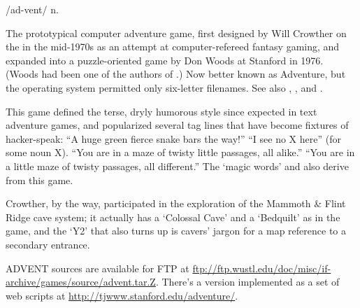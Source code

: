  /ad-vent/ n.

The prototypical computer adventure game, first designed by Will Crowther on the  in the mid-1970s as an attempt at
computer-refereed fantasy gaming, and expanded into a puzzle-oriented game by Don Woods at Stanford in 1976. (Woods had been one of the
authors of .) Now better known as Adventure, but the  operating system permitted only six-letter
filenames. See also , , and .

This game defined the terse, dryly humorous style since expected in text adventure games, and popularized several tag lines that have become
fixtures of hacker-speak: ``A huge green fierce snake bars the way!'' ``I see no X here'' (for some noun X). ``You are in a maze of twisty
little passages, all alike.'' ``You are in a little maze of twisty passages, all different.'' The `magic words'  and
 also derive from this game.

Crowther, by the way, participated in the exploration of the Mammoth \& Flint Ridge cave system; it actually has a `Colossal Cave' and a
`Bedquilt' as in the game, and the `Y2' that also turns up is cavers' jargon for a map reference to a secondary entrance.

ADVENT sources are available for FTP at \url{ftp://ftp.wustl.edu/doc/misc/if-archive/games/source/advent.tar.Z}. There's a version
implemented as a set of web scripts at \url{http://tjwww.stanford.edu/adventure/}.

